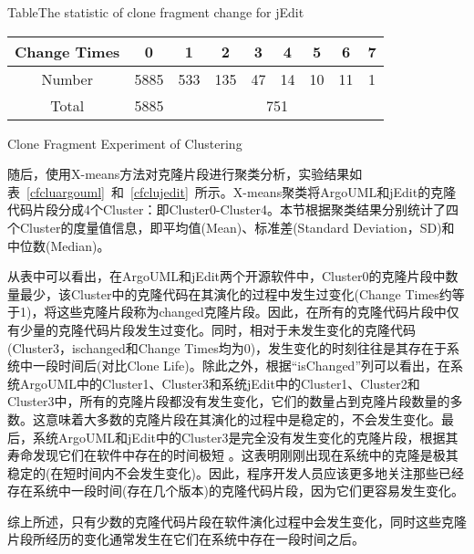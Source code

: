 \begin{table}[htbp]
{Table$\!$}{The statistic of clone fragment change for jEdit}
\vspace{0.5em}
\centering
\wuhao
\begin{tabular}{ccccccccc}
\toprule[1.5pt]
Change Times &0&1&2&3&4&5&6&7\\ 
\midrule[1pt]
Number&5885&533&135&47&14&10&11&1\\ 
\cline{3-9}
Total&5885&\multicolumn{7}{c}{751}   \\ 
\bottomrule[1.5pt]
\end{tabular}
\end{table}

{Clone Fragment Experiment of Clustering}

随后，使用X-means方法对克隆片段进行聚类分析，实验结果如表~\ref{cfcluargouml}~和~\ref{cfclujedit}~所示。X-means聚类将ArgoUML和jEdit的克隆代码片段分成4个Cluster：即Cluster0-Cluster4。本节根据聚类结果分别统计了四个Cluster的度量值信息，即平均值(Mean)、标准差(Standard Deviation，SD)和中位数(Median)。

从表中可以看出，在ArgoUML和jEdit两个开源软件中，Cluster0的克隆片段中数量最少，该Cluster中的克隆代码在其演化的过程中发生过变化(Change Times约等于1)，将这些克隆片段称为changed克隆片段。因此，在所有的克隆代码片段中仅有少量的克隆代码片段发生过变化。同时，相对于未发生变化的克隆代码(Cluster3，ischanged和Change Times均为0)，发生变化的时刻往往是其存在于系统中一段时间后(对比Clone Life)。除此之外，根据“isChanged”列可以看出，在系统ArgoUML中的Cluster1、Cluster3和系统jEdit中的Cluster1、Cluster2和Cluster3中，所有的克隆片段都没有发生变化，它们的数量占到克隆片段数量的多数。这意味着大多数的克隆片段在其演化的过程中是稳定的，不会发生变化。最后，系统ArgoUML和jEdit中的Cluster3是完全没有发生变化的克隆片段，根据其寿命发现它们在软件中存在的时间极短 。这表明刚刚出现在系统中的克隆是极其稳定的(在短时间内不会发生变化)。因此，程序开发人员应该更多地关注那些已经存在系统中一段时间(存在几个版本)的克隆代码片段，因为它们更容易发生变化。

综上所述，只有少数的克隆代码片段在软件演化过程中会发生变化，同时这些克隆片段所经历的变化通常发生在它们在系统中存在一段时间之后。


